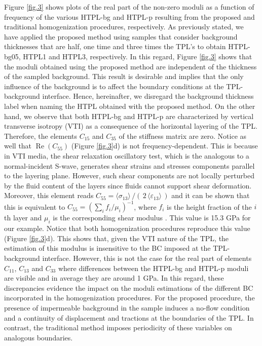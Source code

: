 \documentclass[draft]{agujournal2019}
\renewcommand{\Re}{\operatorname{Re} }
\begin{document}
Figure \ref{fig.3} shows plots of the real part of the non-zero moduli as a function of frequency of the various HTPL-bg and HTPL-p resulting from the proposed  and traditional homogenization procedures, respectively. As previously stated, we have applied the proposed method using samples that consider background thicknesses that are half, one time and three times the TPL's to obtain HTPL-bg05, HTPL1 and HTPL3, respectively. In this regard, Figure \ref{fig.3} shows that the  moduli obtained using the proposed method are independent of the thickness of the sampled background. This result is desirable and implies that the only influence of the background is to affect the boundary conditions at the TPL-background interface. Hence, hereinafter, we disregard the background thickness label when naming the HTPL obtained with the proposed method.
On the other hand, we observe that both HTPL-bg and HTPL-p are characterized by vertical transverse isotropy (VTI) as a consequence of the horizontal layering of the TPL. Therefore, the elements $C_{15}$ and $C_{35}$ of the stiffness matrix are zero. Notice as well that $\Re(C_{55})$  (Figure \ref{fig.3}d) is not frequency-dependent. This is because in VTI media, the shear relaxation oscillatory test, which is the analogous to a normal-incident S-wave, generates shear strains and stresses components  parallel to the layering plane. However, such shear components are not locally perturbed by the fluid content of the layers since fluids cannot support shear deformation. Moreover, this element reads $C_{55} = \langle \sigma_{13}\rangle\,/(\,2\, \langle \varepsilon_{13} \rangle\,)$ and it can be shown that this is equivalent to $C_{55}  =\left( \sum_i f_i/\mu_i \right)^{-1}$, where $f_i$ is the height fraction of the $i$th layer and $\mu_i$ is the corresponding shear modulus \cite{Backus1962, Salamon1968}. This value is 15.3 GPa for our example. Notice that both homogenization procedures reproduce this value (Figure \ref{fig.3}d). This shows that, given the VTI nature of the TPL, the estimation of this modulus is insensitive to the BC imposed at the TPL-background interface. However, this is not the case for the real part of elements $C_{11}$,  $C_{13}$ and $C_{33}$ where differences between the HTPL-bg and HTPL-p moduli are visible and in average they are around 1 GPa. In this regard, these discrepancies evidence the impact on the moduli estimations of the different BC incorporated in the homogenization procedures. For the proposed procedure, the presence of impermeable background in the sample induces a no-flow condition and a continuity of displacement and tractions at the boundaries of the TPL. In contrast, the traditional method imposes periodicity of these variables on analogous boundaries.
\end{document}
